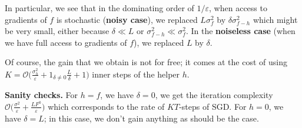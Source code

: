 \documentclass[10pt]{article} %
\theoremstyle{plain}
\theoremstyle{definition}
\theoremstyle{remark}
\begin{document}
In particular, we see that in the dominating order of $1/\varepsilon$, when access to gradients of $f$ is stochastic (\textbf{noisy case}), we replaced $L\sigma_f^2$ by $\delta \sigma_{f-h}^2$ which might be very small, either because $\delta\ll L$ or $\sigma_{f-h}^2\ll \sigma_f^2$. In the \textbf{noiseless case} (when we have full access to gradients of $f$), we replaced $L$ by $\delta$.

Of course, the gain that we obtain is not for free; it comes at the cost of using $K = \mathcal{O}\Big(\frac{\sigma_h^2}{\varepsilon} + 1_{\delta\neq 0}\frac{L}{\delta} + 1\Big)$ inner steps of the helper $h$.


\textbf{Sanity checks.} For $h=f$, we have $\delta=0$, we get the iteration complexity $\mathcal{O}\Big(\frac{\sigma^2}{\varepsilon} + \frac{LF^0}{\varepsilon}\Big)$ which corresponds to the rate of $KT$-steps of SGD. For $h=0$, we have $\delta=L$; in this case, we don't gain anything as should be the case.
\end{document}
